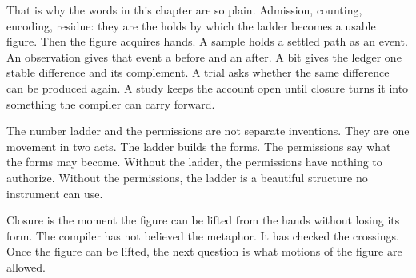 That is why the words in this chapter are so plain. Admission, counting,
encoding, residue: they are the holds by which the ladder becomes a usable
figure. Then the figure acquires hands. A sample holds a settled path as an
event. An observation gives that event a before and an after. A bit gives the
ledger one stable difference and its complement. A trial asks whether the same
difference can be produced again. A study keeps the account open until closure
turns it into something the compiler can carry forward.

The number ladder and the permissions are not separate inventions. They are one
movement in two acts. The ladder builds the forms. The permissions say what the
forms may become. Without the ladder, the permissions have nothing to authorize.
Without the permissions, the ladder is a beautiful structure no instrument can
use.

Closure is the moment the figure can be lifted from the hands without losing
its form. The compiler has not believed the metaphor. It has checked the
crossings. Once the figure can be lifted, the next question is what motions of
the figure are allowed.
